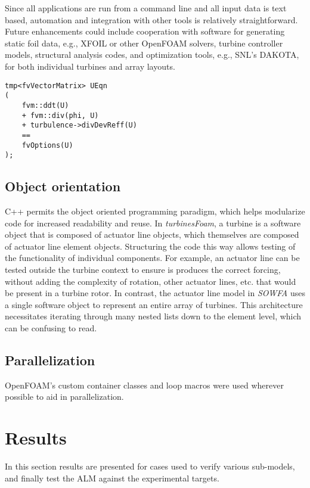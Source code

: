 Since all applications are run from a command line and all input data is text
based, automation and integration with other tools is relatively
straightforward. Future enhancements could include cooperation with software for
generating static foil data, e.g., XFOIL or other OpenFOAM solvers, turbine
controller models, structural analysis codes, and optimization tools, e.g.,
SNL's DAKOTA, for both individual turbines and array layouts.

\begin{lstlisting}[float,caption=Adding source terms to the momentum equation in OpenFOAM.,label=lst:fvOptions]
tmp<fvVectorMatrix> UEqn
(
    fvm::ddt(U)
    + fvm::div(phi, U)
    + turbulence->divDevReff(U)
    ==
    fvOptions(U)
);
\end{lstlisting}


\subsection{Object orientation}

C++ permits the object oriented programming paradigm, which helps modularize
code for increased readability and reuse. In \textit{turbinesFoam}, a turbine is
a software object that is composed of actuator line objects, which themselves
are composed of actuator line element objects. Structuring the code this way
allows testing of the functionality of individual components. For example, an
actuator line can be tested outside the turbine context to ensure is produces
the correct forcing, without adding the complexity of rotation, other actuator
lines, etc. that would be present in a turbine rotor. In contrast, the actuator
line model in \textit{SOWFA} uses a single software object to represent an
entire array of turbines. This architecture necessitates iterating through many
nested lists down to the element level, which can be confusing to read.


\subsection{Parallelization}

OpenFOAM's custom container classes and loop macros were used wherever possible
to aid in parallelization.


\section{Results}

In this section results are presented for cases used to verify various
sub-models, and finally test the ALM against the experimental targets.

